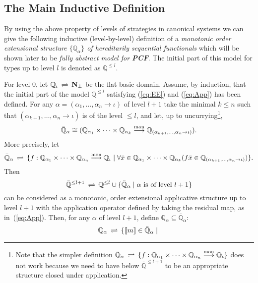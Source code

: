 \documentclass[fleqn]{LMCS}
\theoremstyle{plain}\newtheorem{satz}[thm]{Satz}
\theoremstyle{plain}\newtheorem{hyp}[thm]{Hypothesis}
\theoremstyle{plain}\newtheorem{hyps}[thm]{Hypotheses}
\theoremstyle{definition}\newtheorem{note}[thm]{Note}
\newcommand{\setof}[1]{\{#1\}}
\newcommand{\bYdef}{\mathrel{\BYDEF}}
\newcommand{\BYDEF}{\mbox{$\hspace{.2em}\rightleftharpoons\hspace{.2em}$}}
\newcommand{\arr}{\rightarrow}
\newcommand{\arrr}{\longrightarrow}
\newcommand{\Dsem}[1]{[\![ #1 ]\!]}
\newcommand{\NN}{\mathbf{N}}
\newcommand{\bbQ}{\mathbb{Q}}
\newcommand{\Basictype}{\iota}
\newcommand{\PCF}{\mbox{\bf PCF}}
\newcommand{\Undef}{{\perp}}
\newcommand{\bx}{\bar{x}}
\newcommand{\?}{\mbox{?}}
\begin{document}
\subsection{The Main Inductive Definition}
\label{sec:ind-def}

\noindent
By using the above property of levels of strategies in canonical systems
we can give the
following inductive (level-by-level) definition of a 
\emph{monotonic order extensional structure
$\{\bbQ_{\alpha}\}$ of hereditarily sequential functionals} 
which will be shown later to be \emph{fully abstract model for\/ \PCF}. 
The initial part of this model for types up to level $l$ is denoted as $\bbQ^{\le l}$.
\begin{defi}\label{def:bbQ}For level 0, 
let $\bbQ_{\iota} \bYdef  \NN_{\Undef}$ 
be the flat basic domain. 
Assume, by induction, that 
the initial part of the model 
$\bbQ^{\le l}$ satisfying (\ref{eq:EE}) and (\ref{eq:App}) 
has been defined. 
For any $\alpha=(\alpha_1,\ldots,\alpha_n\arr\iota)$ of level $l+1$
take the minimal $k\le n$ such that 
$(\alpha_{k+1},\ldots,\alpha_n\arr\iota)$ is of the level ${}\le l$, and let, 
up to uncurrying\footnote{Note that the simpler definition 
$\bar{\bbQ}_\alpha
\bYdef
\{f:\bbQ_{\alpha_1}\times\cdots\times \bbQ_{\alpha_n}
\stackrel{\rm mon}{\arrr} \bbQ_{\Basictype}\}
$
does not work 
because we need to have below $\bar{\bbQ}^{\le l+1}$ to be an appropriate 
structure closed under application. 
}, 
\[
\bar{\bbQ}_\alpha\cong
(\bbQ_{\alpha_1}\times\cdots\times \bbQ_{\alpha_k}
\stackrel{\rm mon}{\arrr} 
\bbQ_{(\alpha_{k+1},\ldots,\alpha_n\arr\iota)}).
\]
\noindent
More precisely, let 
\begin{equation*}
\bar{\bbQ}_\alpha
\bYdef
\{f:\bbQ_{\alpha_1}\times\cdots\times \bbQ_{\alpha_n}
\stackrel{\rm mon}{\arrr} \bbQ_{\Basictype}
\mid
\forall\bx\in\bbQ_{\alpha_1}\times\cdots\times \bbQ_{\alpha_{k}} 
(
f\bx\in 
\bbQ_{(\alpha_{k+1},\ldots,\alpha_n\arr\iota)}
)
\}.
\end{equation*}
Then
\begin{equation}\label{eq:model}
\bar{\bbQ}{}^{\le l+1}\bYdef\bbQ^{\le l}\cup
\setof{\bar{\bbQ}_\alpha\mid\alpha\mbox{ is of level }l+1}
\end{equation}
can be considered as  
a monotonic, order extensional applicative structure up to level $l+1$ 
with the application operator defined by taking the residual map, 
as in~(\ref{eq:App}). 
Then, for any $\alpha$ of level $l+1$, define $\bbQ_\alpha\subseteq\bar{\bbQ}_\alpha$: 
\begin{align}
\bbQ_{\alpha}\bYdef\{\Dsem{m}\in\bar{\bbQ}_{\alpha} \mid {}

\end{align}
\end{defi}
\end{document}
